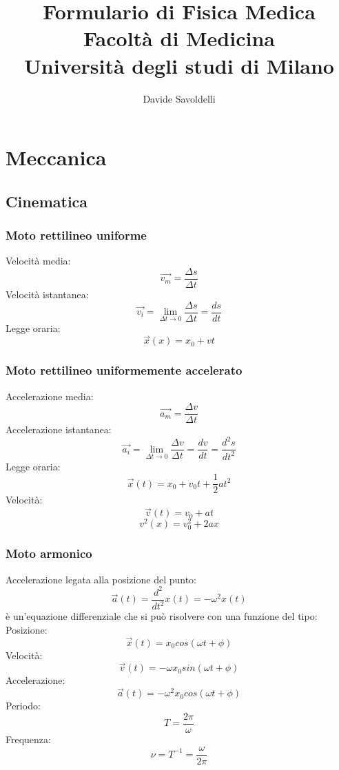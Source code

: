 \documentclass[12pt]{article}
\begin{document}
\title{%
  Formulario di Fisica Medica \\
  \large Facoltà di Medicina \\
  Università degli studi di Milano \\
}

\author{Davide Savoldelli}

\maketitle
\tableofcontents


\section{Meccanica}
    \subsection{Cinematica}
        \subsubsection{Moto rettilineo uniforme}
            Velocità media: \[\vec{v_m} = \frac{\Delta s}{\Delta t}\]
            Velocità istantanea: \[\vec{v_i} = \lim_{\Delta t \to 0}{\frac{\Delta s}{\Delta t} = \frac{ds}{dt}}\]
            Legge oraria: \[\vec{x}(x) = x_0 + vt\]
        \subsubsection{Moto rettilineo uniformemente accelerato}
            Accelerazione media: \[\vec{a_m} = \frac{\Delta v}{\Delta t}\]
            Accelerazione istantanea: \[\vec{a_i} = \lim_{\Delta t \to 0}{\frac{\Delta v}{\Delta t} = \frac{dv}{dt}} = \frac{d^2s}{dt^2}\]
            Legge oraria: \[\vec{x}(t) = x_0 + v_0t + \frac{1}{2}at^2\]
            Velocità: \[\vec{v}(t) = v_0 + at\]
            \[v^2(x) = v_0^2 + 2ax \]
        \subsubsection{Moto armonico}
            Accelerazione legata alla posizione del punto:
            \[\vec{a}(t) = \frac{d^2}{dt^2}x(t) = -\omega^2x(t) \] 
            è un'equazione differenziale che si può risolvere con una funzione del tipo:
            Posizione: \[\vec{x}(t) = x_0 cos(\omega t + \phi)\]
            Velocità: \[\vec{v}(t) = -\omega x_0 sin(\omega t + \phi)\]
            Accelerazione: \[\vec{a}(t) = -\omega^2 x_0 cos(\omega t + \phi)\]
            Periodo: \[T = \frac{2\pi}{\omega}\]
            Frequenza: \[\nu = T^{-1} = \frac{\omega}{2\pi}\]
\end{document}
